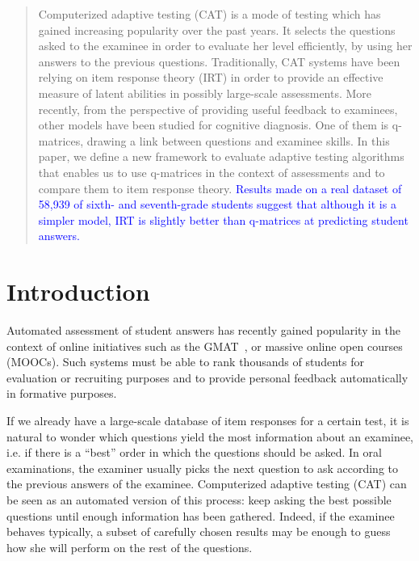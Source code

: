 \documentclass{sig-alternate}
\newcommand\note[1]{\textcolor{blue}{#1}}
\begin{document}
\maketitle
\begin{abstract}
Computerized adaptive testing (CAT) is a mode of testing which has gained increasing popularity over the past years. It selects the questions asked to the examinee in order to evaluate her level efficiently, by using her answers to the previous questions.
Traditionally, CAT systems have been relying on item response theory (IRT) in order to provide an effective measure of latent abilities in possibly large-scale assessments.
More recently, from the perspective of providing useful feedback to examinees, other models have been studied for cognitive diagnosis. One of them is q-matrices, drawing a link between questions and examinee skills.
In this paper, we define a new framework to evaluate adaptive testing algorithms that enables us to use q-matrices in the context of assessments and to compare them to item response theory.
\note{Results made on a real dataset of 58,939 of sixth- and seventh-grade students suggest that although it is a simpler model, IRT is slightly better than q-matrices at predicting student answers.}
\end{abstract}




\newpage

\section{Introduction}
Automated assessment of student answers has recently gained popularity in the context of online initiatives such as the GMAT~\citep{Rudner2010}, or massive online open courses (MOOCs). Such systems must be able to rank thousands of students for evaluation or recruiting purposes and to provide personal feedback automatically in formative purposes.

If we already have a large-scale database of item responses for a certain test, it is natural to wonder which questions yield the most information about an examinee, i.e. if there is a ``best'' order in which the questions should be asked. In oral examinations, the examiner usually picks the next question to ask according to the previous answers of the examinee. Computerized adaptive testing (CAT) can be seen as an automated version of this process: keep asking the best possible questions until enough information has been gathered. Indeed, if the examinee behaves typically, a subset of carefully chosen results may be enough to guess how she will perform on the rest of the questions.
\end{document}
